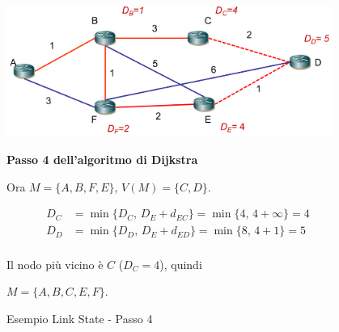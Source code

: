\begin{figure}[h!]
    \begin{minipage}{0.5\textwidth}
        \centering
        \includegraphics[width=0.95\textwidth]{images/linkstate10.png}
        \caption{Esempio Link State - Passo 4}
        \label{fig:linkstate9}
    \end{minipage}\hfill
    \begin{minipage}{0.49\textwidth}
        \textbf{Passo 4 dell'algoritmo di Dijkstra}

        Ora $M = \{A, B, F, E\}$, $V(M) = \{C, D\}$.

        \[
        \begin{aligned}
        D_C &= \min\{ D_C,\, D_E + d_{EC} \} = \min\{4,\, 4 + \infty\} = 4 \\
        D_D &= \min\{ D_D,\, D_E + d_{ED} \} = \min\{8,\, 4 + 1\} = 5 \\
        \end{aligned}
        \]

        Il nodo più vicino è $C$ ($D_C = 4$), quindi 
        
        $M = \{A, B, C, E, F\}$.
    \end{minipage}
\end{figure}

